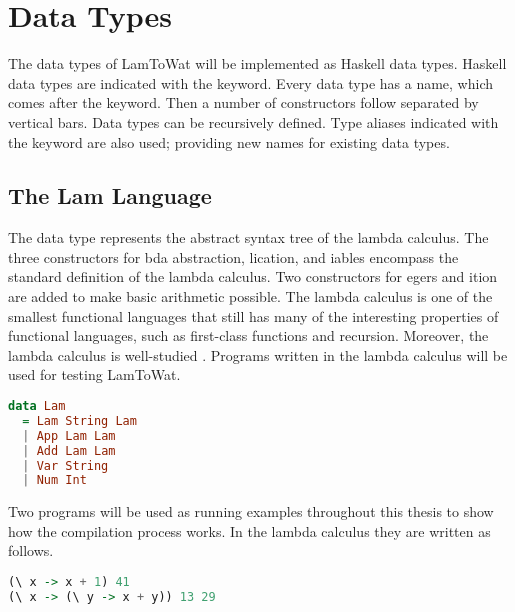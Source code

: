 \section{\label{section:datatypes}Data Types}
The data types of LamToWat will be implemented as Haskell data types. Haskell data types are indicated with the  keyword. Every data type has a name, which comes after the keyword. Then a number of constructors follow separated by vertical bars. Data types can be recursively defined. Type aliases indicated with the  keyword are also used; providing new names for existing data types.

\subsection{\label{subsection:expdata}The Lam Language}
The  data type represents the abstract syntax tree of the lambda calculus. The three constructors for bda abstraction, lication, and iables encompass the standard definition of the lambda calculus. Two constructors for egers and ition are added to make basic arithmetic possible. The lambda calculus is one of the smallest functional languages that still has many of the interesting properties of functional languages, such as first-class functions and recursion. Moreover, the lambda calculus is well-studied \autocite{barendregt1984lambda}. Programs written in the lambda calculus will be used for testing LamToWat.

\begin{lstlisting}[language=Haskell]
data Lam
  = Lam String Lam
  | App Lam Lam
  | Add Lam Lam
  | Var String
  | Num Int
\end{lstlisting}

Two programs will be used as running examples throughout this thesis to show how the compilation process works. In the lambda calculus they are written as follows.

\begin{lstlisting}[language=Haskell]
(\ x -> x + 1) 41
(\ x -> (\ y -> x + y)) 13 29
\end{lstlisting}

